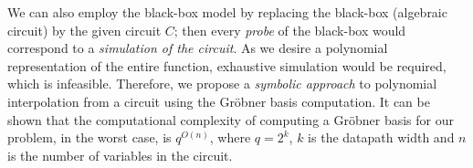 We can also employ the black-box model by replacing the black-box
(algebraic circuit) by the given circuit $C$; then every {\it probe}
of the black-box would correspond to a {\it simulation of the
  circuit}. As we desire a polynomial representation of the entire
function, exhaustive simulation would be required, which is
infeasible. Therefore, we propose a {\it symbolic approach} to
polynomial interpolation from a circuit using the Gr\"obner basis
computation. It can be shown that the computational complexity of
computing a Gr\"obner basis for our problem, in the worst case, is
$q^{O(n)}$, where $q = 2^k$, $k$ is the datapath width and $n$ is the
number of variables in the circuit.  
